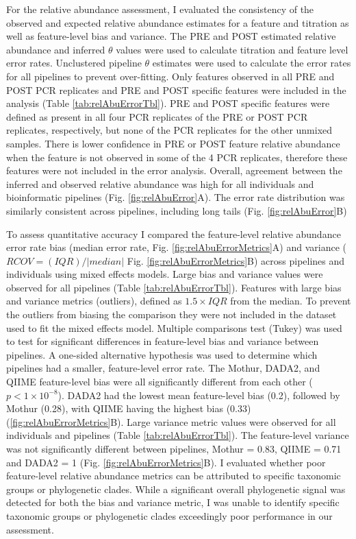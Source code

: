 \documentclass[smallextended]{svjour3}       %
\begin{document}
For the relative abundance assessment, I evaluated the consistency of
the observed and expected relative abundance estimates for a feature and
titration as well as feature-level bias and variance. The PRE and POST
estimated relative abundance and inferred \(\theta\) values were used to
calculate titration and feature level error rates. Unclustered pipeline
\(\theta\) estimates were used to calculate the error rates for all
pipelines to prevent over-fitting. Only features observed in all PRE and
POST PCR replicates and PRE and POST specific features were included in
the analysis (Table \ref{tab:relAbuErrorTbl}). PRE and POST specific
features were defined as present in all four PCR replicates of the PRE
or POST PCR replicates, respectively, but none of the PCR replicates for
the other unmixed samples. There is lower confidence in PRE or POST
feature relative abundance when the feature is not observed in some of
the 4 PCR replicates, therefore these features were not included in the
error analysis. Overall, agreement between the inferred and observed
relative abundance was high for all individuals and bioinformatic
pipelines (Fig. \ref{fig:relAbuError}A). The error rate distribution was
similarly consistent across pipelines, including long tails (Fig.
\ref{fig:relAbuError}B)

To assess quantitative accuracy I compared the feature-level relative
abundance error rate bias (median error rate, Fig.
\ref{fig:relAbuErrorMetrics}A) and variance (\(RCOV=(IQR)/|median|\)
Fig. \ref{fig:relAbuErrorMetrics}B) across pipelines and individuals
using mixed effects models. Large bias and variance values were observed
for all pipelines (Table \ref{tab:relAbuErrorTbl}). Features with large
bias and variance metrics (outliers), defined as \(1.5\times IQR\) from
the median. To prevent the outliers from biasing the comparison they
were not included in the dataset used to fit the mixed effects model.
Multiple comparisons test (Tukey) was used to test for significant
differences in feature-level bias and variance between pipelines. A
one-sided alternative hypothesis was used to determine which pipelines
had a smaller, feature-level error rate. The Mothur, DADA2, and QIIME
feature-level bias were all significantly different from each other
(\(p < 1\times 10^{-8}\)). DADA2 had the lowest mean feature-level bias
(0.2), followed by Mothur (0.28), with QIIME having the highest bias
(0.33) (\ref{fig:relAbuErrorMetrics}B). Large variance metric values
were observed for all individuals and pipelines (Table
\ref{tab:relAbuErrorTbl}). The feature-level variance was not
significantly different between pipelines, Mothur = 0.83, QIIME = 0.71
and DADA2 = 1 (Fig. \ref{fig:relAbuErrorMetrics}B). I evaluated whether
poor feature-level relative abundance metrics can be attributed to
specific taxonomic groups or phylogenetic clades. While a significant
overall phylogenetic signal was detected for both the bias and variance
metric, I was unable to identify specific taxonomic groups or
phylogenetic clades exceedingly poor performance in our assessment.
\end{document}
